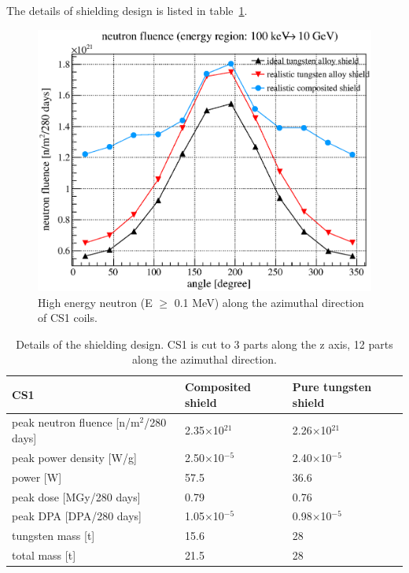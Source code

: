 The details of shielding design is listed in table~\ref{hrsdet}.
 \begin{figure}[H]
  \centering
  \includegraphics[scale=0.43]{chapter3/fig/fluence.eps}
  \caption{High energy neutron (E $\geq$ 0.1 MeV) along the azimuthal direction of CS1 coils.}
  \label{2flux}
 \end{figure}
\begin{table}[H]
 \centering
 \begin{tabular}{lll} \hline \hline
  CS1 & Composited shield & Pure tungsten shield \\ \hline
  peak neutron fluence [n/m$^2$/280 days] & 2.35$\times$10$^{21}$ & 2.26$\times$10$^{21}$ \\
  peak power density [W/g] & 2.50$\times$10$^{-5}$ & 2.40$\times$10$^{-5}$ \\
  power [W] & 57.5 & 36.6 \\
  peak dose [MGy/280 days] & 0.79 & 0.76 \\
  peak DPA [DPA/280 days] & 1.05$\times$10$^{-5}$ & 0.98$\times$10$^{-5}$ \\
  tungsten mass [t] & 15.6 & 28 \\
  total mass [t] & 21.5 & 28 \\ \hline \hline
 \end{tabular}
 \caption{Details of the shielding design. CS1 is cut to 3 parts along the z axis, 12 parts along the azimuthal direction.}
 \label{hrsdet}
\end{table}

